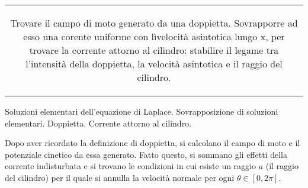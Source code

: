 \noindent
\begin{tabular}{c}
\begin{minipage}[b]{0.95\textwidth}
\begin{exerciseS}[Doppietta]
Trovare il campo di moto generato da una doppietta.
Sovrapporre ad esso una corente uniforme con lìvelocità asintotica lungo x, per trovare la corrente attorno al cilindro: stabilire il legame tra l'intensità della doppietta, la velocità asintotica e il raggio del cilindro.
\end{exerciseS}
\end{minipage}
\end{tabular}


\sol

\partone
  Soluzioni elementari dell'equazione di Laplace. 
  Sovrapposizione di soluzioni elementari. Doppietta. Corrente attorno
  al cilindro.

\parttwo
  Dopo aver ricordato la definizione di doppietta, si calcolano il campo di moto e il potenziale cinetico da essa generato. Fatto questo, si sommano gli effetti della corrente indisturbata e si trovano le condizioni in cui esiste un raggio $a$ (il raggio del cilindro) per il quale si annulla la velocità normale per ogni $\theta \in [0, 2\pi]$.

